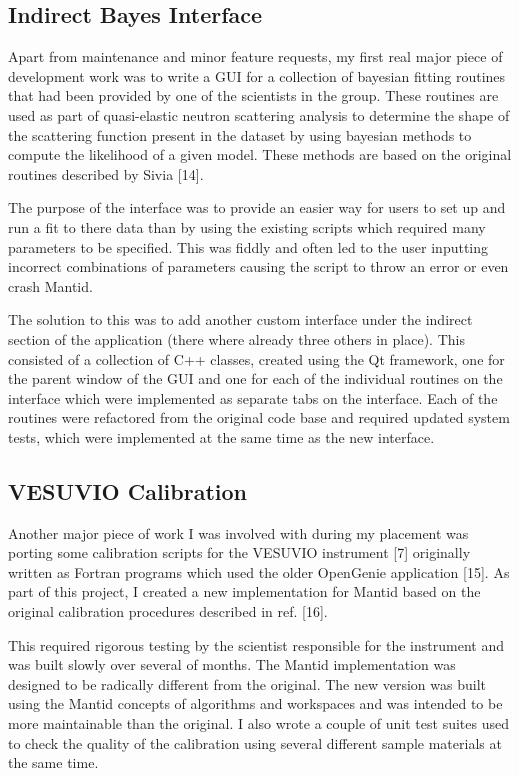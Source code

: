 \documentclass[paper=a4, fontsize=11pt]{scrartcl}	%
\numberwithin{equation}{section}															%
\numberwithin{figure}{section}																%
\numberwithin{table}{section}
\begin{document}
\subsection{Indirect Bayes Interface}\label{indirect-bayes-interface}

Apart from maintenance and minor feature requests, my first real major
piece of development work was to write a GUI for a collection of
bayesian fitting routines that had been provided by one of the
scientists in the group. These routines are used as part of
quasi-elastic neutron scattering analysis to determine the shape of the
scattering function present in the dataset by using bayesian methods to
compute the likelihood of a given model. These methods are based on the
original routines described by Sivia {[}14{]}.

The purpose of the interface was to provide an easier way for users to
set up and run a fit to there data than by using the existing scripts
which required many parameters to be specified. This was fiddly and
often led to the user inputting incorrect combinations of parameters
causing the script to throw an error or even crash Mantid.

The solution to this was to add another custom interface under the
indirect section of the application (there where already three others in
place). This consisted of a collection of C++ classes, created using the
Qt framework, one for the parent window of the GUI and one for each of
the individual routines on the interface which were implemented as
separate tabs on the interface. Each of the routines were refactored
from the original code base and required updated system tests, which
were implemented at the same time as the new interface.

\subsection{VESUVIO Calibration}\label{vesuvio-calibration}

Another major piece of work I was involved with during my placement was
porting some calibration scripts for the VESUVIO instrument {[}7{]}
originally written as Fortran programs which used the older OpenGenie
application {[}15{]}. As part of this project, I created a new
implementation for Mantid based on the original calibration procedures
described in ref. {[}16{]}.

This required rigorous testing by the scientist responsible for the
instrument and was built slowly over several of months. The Mantid
implementation was designed to be radically different from the original.
The new version was built using the Mantid concepts of algorithms and
workspaces and was intended to be more maintainable than the original. I
also wrote a couple of unit test suites used to check the quality of the
calibration using several different sample materials at the same time.
\end{document}
